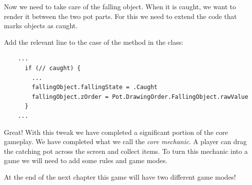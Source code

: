 Now we need to take care of the falling object. When it is caught, we want to
render it between the two pot parts. For this we need to extend the code that
marks objects as caught.
\begin{leftbar}
Add the relevant line to the  case of the
 method in the  class:
\begin{lstlisting}
    ...
      if (// caught) {
        ...
        fallingObject.fallingState = .Caught
        fallingObject.zOrder = Pot.DrawingOrder.FallingObject.rawValue
      }
    ...
\end{lstlisting}
\end{leftbar}
Great! With this tweak we have completed a significant portion of the core
gameplay. We have completed what we call the \textit{core mechanic}. A player
can drag the catching pot across the screen and collect items. To turn this
mechanic into a game we will need to add some rules and game modes. 

At the end of the next chapter this game will have two different game modes!

